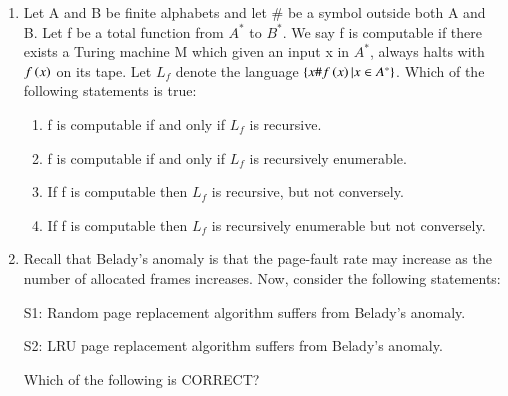 \documentclass[a4paper, 11pt]{article}
\begin{document}
\begin{enumerate}
    \item Let A and B be finite alphabets and let \# be a symbol outside both A and B. Let f be a total function from $A^{*}$ to $B^{*}$. We say f is computable if there exists a Turing machine M which given an input x in $A^{*}$, always halts with $f\left(x\right)$ on its tape.
    Let $L_{f}$ denote the language $\{x\#f\left(x\right)|x\in A^{*}\}$. Which of the following statements is true:
    \begin{enumerate}
        \item f is computable if and only if $L_{f}$ is recursive.
        \item f is computable if and only if $L_{f}$ is recursively enumerable.
        \item If f is computable then $L_{f}$ is recursive, but not conversely.
        \item If f is computable then $L_{f}$ is recursively enumerable but not conversely.
    \end{enumerate}
    
    \hfill{}

    \item Recall that Belady's anomaly is that the page-fault rate may increase as the number of allocated frames increases. Now, consider the following statements:
    \begin{center}
    S1: Random page replacement algorithm  suffers from Belady's anomaly.
    
    S2: LRU page replacement algorithm suffers from Belady's anomaly.
    \end{center}
    
    Which of the following is CORRECT?
    \begin{enumerate}
    \end{enumerate}
    
    \hfill{}
    

\end{enumerate}
\end{document}
